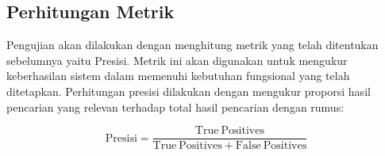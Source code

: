 \subsection{Perhitungan Metrik}

Pengujian akan dilakukan dengan menghitung metrik yang telah ditentukan sebelumnya yaitu Presisi. Metrik ini akan digunakan untuk mengukur keberhasilan sistem dalam memenuhi kebutuhan fungsional yang telah ditetapkan. Perhitungan presisi dilakukan dengan mengukur proporsi hasil pencarian yang relevan terhadap total hasil pencarian dengan rumus:

\[
	\mathrm{Presisi} = \frac{\mathrm{True\ Positives}}{\mathrm{True\ Positives} + \mathrm{False\ Positives}}
\]
